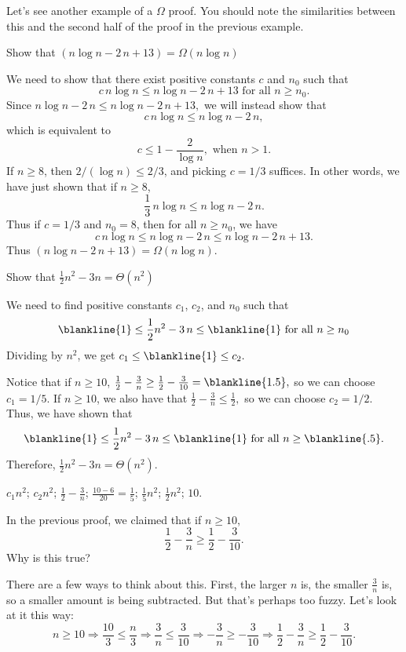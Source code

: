 Let's see another example of a $\Omega$ proof.  You should note
the similarities between this and the second half of the proof in
the previous example.
\begin{exa}
Show that $(n \log n - 2\,n + 13)=\Omega(n \log n)$
\begin{pf}
We need to show that there exist positive constants $c$ and $n_0$
such that 
$$c\,n\log n \leq n\log n -2\,n + 13\mbox{ for all } n\geq n_0.$$
Since $n\log n -2\,n \leq n\log n -2\,n+13,$
we will instead show that 
$$c\,n\log n \leq n\log n -2\,n,$$
which is equivalent to
$$c\leq 1-\frac{2}{\log n}, \mbox{ when } n > 1.$$ 
If $n\geq 8$, then $2/(\log n)\leq 2/3$, and picking
$c=1/3$ suffices.
In other words, we have just shown that if $n\geq 8$, 
$$\frac{1}{3}\,n\log n \leq n\log n -2\,n.$$
Thus if $c=1/3$ and $n_0=8$, then for all $n\geq n_0$, we have
$$c\,n\log n \leq n\log n -2\,n \leq n\log n -2\,n + 13.$$
Thus $(n \log n - 2\,n + 13)=\Omega(n \log n)$.
\end{pf}
\end{exa}

\begin{fib}
Show that $\frac{1}{2} n^{2} - 3n = \Theta(n^{2})$
\begin{pf}
We need to find positive constants $c_1$, $c_2$, and $n_0$ such that
$$\blankline{1} \leq \frac{1}{2}n^2 - 3\,n \leq \blankline{1}\mbox{ for all } n\geq n_0$$
Dividing by $n^{2}$, we get  $c_{1} \leq \blankline{1} \leq c_{2}.$

Notice that if $n\geq 10$,  $\frac{1}{2} - \frac{3}{n} \geq \frac{1}{2} - \frac{3}{10} = \blankline{1.5},$
so we can choose $c_1 =1/5$. 
If $n\geq 10$, we also have that $\frac{1}{2} - \frac{3}{n}\leq \frac{1}{2},$
so we can choose $c_2=1/2$.
Thus, we have shown that 
$$\blankline{1} \leq \frac{1}{2}n^2 - 3\,n \leq \blankline{1} 
\mbox{ for all } n\geq \blankline{.5} .$$
Therefore, $\frac{1}{2} n^{2} - 3n =\Theta(n^{2})$.
\end{pf}
\begin{answer}
$c_{1}n^2$; 
$c_{2}n^2$; 
$\frac{1}{2} - \frac{3}{n}$;
$\frac{10-6}{20}=\frac{1}{5}$; 
$\frac{1}{5}n^2$; 
$\frac{1}{2}n^2$; 
 $10$.
\end{answer}
\end{fib}

\begin{ques}
In the previous proof, we claimed that if $n\geq 10$, 
$$\frac{1}{2} - \frac{3}{n} \geq \frac{1}{2} - \frac{3}{10}.$$
Why is this true?

\noindent
\answerlinethree
\begin{answer}
There are a few ways to think about this.  First, the larger $n$ is, the smaller $\frac{3}{n}$ is,
so a smaller amount is being subtracted.  But that's perhaps too fuzzy.  Let's look at it this way:
$$n\geq 10\Rightarrow 
 \frac{10}{3} \leq \frac{n}{3}
\Rightarrow \frac{3}{n}\leq \frac{3}{10}
\Rightarrow -\frac{3}{n}\geq -\frac{3}{10}
\Rightarrow \frac{1}{2}-\frac{3}{n}\geq \frac{1}{2}-\frac{3}{10}.
$$
\end{answer}
\end{ques}


